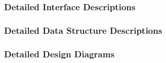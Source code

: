 \documentclass{article}
\begin{document}

\subsubsection{Detailed Interface Descriptions}
\label{did}



\subsubsection{Detailed Data Structure Descriptions}
\label{ddsd}


\subsubsection{Detailed Design Diagrams}
\label{ddd}
\end{document}
